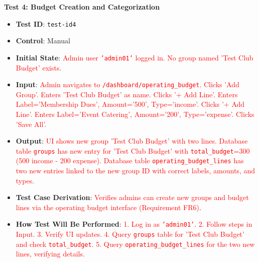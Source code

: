 \documentclass[12pt, titlepage]{article}
\begin{document}
\textbf{Test 4: Budget Creation and Categorization} \label{test-id4}
\begin{itemize}
    \item \textbf{Test ID}: \texttt{test-id4}
    \item \textbf{Control}: Manual
    \item \textbf{Initial State}: \textcolor{red}{Admin user \texttt{'admin01'} logged in. No group named 'Test Club Budget' exists.}
    \item \textbf{Input}: \textcolor{red}{Admin navigates to \texttt{/dashboard/operating\_budget}. Clicks 'Add Group'. Enters 'Test Club Budget' as name. Clicks '+ Add Line'. Enters Label='Membership Dues', Amount='500', Type='income'. Clicks '+ Add Line'. Enters Label='Event Catering', Amount='200', Type='expense'. Clicks 'Save All'.}
    \item \textbf{Output}: \textcolor{red}{UI shows new group 'Test Club Budget' with two lines. Database table \texttt{groups} has new entry for 'Test Club Budget' with \texttt{total\_budget}=300 (500 income - 200 expense). Database table \texttt{operating\_budget\_lines} has two new entries linked to the new group ID with correct labels, amounts, and types.}
    \item \textbf{Test Case Derivation}: \textcolor{red}{Verifies admins can create new groups and budget lines via the operating budget interface (Requirement FR6)}.
    \item \textbf{How Test Will Be Performed}: \textcolor{red}{1. Log in as \texttt{'admin01'}. 2. Follow steps in Input. 3. Verify UI updates. 4. Query \texttt{groups} table for 'Test Club Budget' and check \texttt{total\_budget}. 5. Query \texttt{operating\_budget\_lines} for the two new lines, verifying details.}
\end{itemize}
\end{document}

